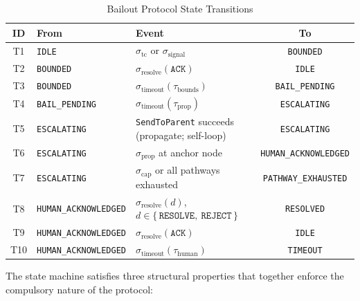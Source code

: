 \begin{table}[t]
\caption{Bailout Protocol State Transitions}
\label{tab:bp-transitions}
\medskip
\noindent\begin{tabular}{cllc}
\toprule
\textbf{ID} & \textbf{From} & \textbf{Event} & \textbf{To} \\
\midrule
T1 & \texttt{IDLE}                  & $\sigma_{\text{tc}}$ or $\sigma_{\text{signal}}$                      & \texttt{BOUNDED} \\
T2 & \texttt{BOUNDED}               & $\sigma_{\text{resolve}}(\texttt{ACK})$                                & \texttt{IDLE} \\
T3 & \texttt{BOUNDED}               & $\sigma_{\text{timeout}}(\tau_{\text{bounds}})$                        & \texttt{BAIL\_PENDING} \\
T4 & \texttt{BAIL\_PENDING}          & $\sigma_{\text{timeout}}(\tau_{\text{prop}})$                          & \texttt{ESCALATING} \\
T5 & \texttt{ESCALATING}            & \texttt{SendToParent} succeeds (propagate; self-loop)                & \texttt{ESCALATING} \\
T6 & \texttt{ESCALATING}            & $\sigma_{\text{prop}}$ at anchor node                                & \texttt{HUMAN\_ACKNOWLEDGED} \\
T7 & \texttt{ESCALATING}            & $\sigma_{\text{cap}}$ or all pathways exhausted                      & \texttt{PATHWAY\_EXHAUSTED} \\
T8 & \texttt{HUMAN\_ACKNOWLEDGED}   & $\sigma_{\text{resolve}}(d)$, $d \in \{\,\texttt{RESOLVE},\ \texttt{REJECT}\,\}$ & \texttt{RESOLVED} \\
T9 & \texttt{HUMAN\_ACKNOWLEDGED}   & $\sigma_{\text{resolve}}(\texttt{ACK})$                               & \texttt{IDLE} \\
T10 & \texttt{HUMAN\_ACKNOWLEDGED}   & $\sigma_{\text{timeout}}(\tau_{\text{human}})$                         & \texttt{TIMEOUT} \\
\bottomrule
\end{tabular}
\end{table}

The state machine satisfies three structural properties that together enforce the compulsory nature of the protocol:

